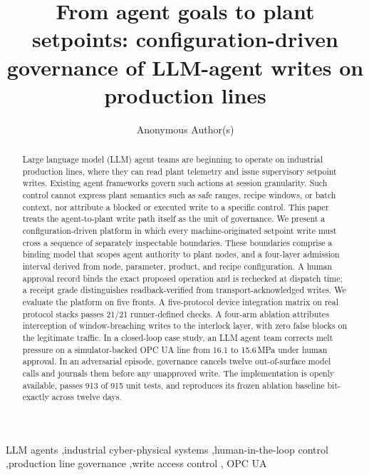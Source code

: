 \documentclass[authoryear,preprint,12pt,a4paper]{elsarticle}
\begin{document}
\begin{frontmatter}

\title{From agent goals to plant setpoints: configuration-driven governance
of LLM-agent writes on production lines}

\author[inst1]{Anonymous Author(s)}

\begin{abstract}
Large language model (LLM) agent teams are beginning to operate on industrial
production lines, where they can read plant telemetry and issue supervisory
setpoint writes. Existing agent frameworks govern such actions at session
granularity. Such control cannot express plant semantics such as safe ranges,
recipe windows, or batch context, nor attribute a blocked or executed write
to a specific control. This paper treats the agent-to-plant write path itself
as the unit of governance. We present a configuration-driven platform in
which every machine-originated setpoint write must cross a sequence of
separately inspectable boundaries. These boundaries comprise a binding model
that scopes agent authority to plant nodes, and a four-layer admission
interval derived from node, parameter, product, and recipe configuration. A
human approval record binds the exact proposed operation and is rechecked at
dispatch time; a receipt grade distinguishes readback-verified from
transport-acknowledged writes. We evaluate the platform on five fronts. A
five-protocol device integration matrix on real protocol stacks passes 21/21
runner-defined checks. A four-arm ablation attributes interception of
window-breaching writes to the interlock layer, with zero false blocks on
the legitimate traffic. In a closed-loop case study, an LLM agent team
corrects melt pressure on a simulator-backed OPC UA line from 16.1 to
15.6\,MPa under human approval. In an adversarial episode, governance
cancels twelve out-of-surface model calls and journals them before any
unapproved write. The implementation is openly available, passes 913 of 915
unit tests, and reproduces its frozen ablation baseline bit-exactly across
twelve days.
\end{abstract}

\begin{keyword}
LLM agents \sep industrial cyber-physical systems \sep human-in-the-loop
control \sep production line governance \sep write access control \sep
OPC UA
\end{keyword}

\end{frontmatter}
\end{document}

